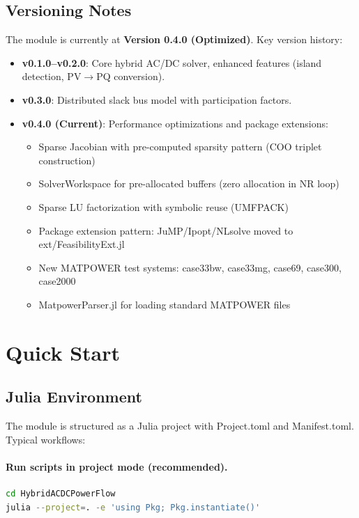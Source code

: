 \documentclass[11pt]{article}
\def\code#1{#1}%
\def\file#1{#1}%
\newcommand{\code}[1]{\nolinkurl{#1}}
\newcommand{\file}[1]{\path{#1}}
\begin{document}
\subsection{Versioning Notes}
The module is currently at \textbf{Version 0.4.0 (Optimized)}. Key version history:
\begin{itemize}[leftmargin=*]
  \item \textbf{v0.1.0--v0.2.0}: Core hybrid AC/DC solver, enhanced features (island detection, PV$\rightarrow$PQ conversion).
  \item \textbf{v0.3.0}: Distributed slack bus model with participation factors.
  \item \textbf{v0.4.0 (Current)}: Performance optimizations and package extensions:
  \begin{itemize}
    \item Sparse Jacobian with pre-computed sparsity pattern (COO triplet construction)
    \item \code{SolverWorkspace} for pre-allocated buffers (zero allocation in NR loop)
    \item Sparse LU factorization with symbolic reuse (UMFPACK)
    \item Package extension pattern: JuMP/Ipopt/NLsolve moved to \code{ext/FeasibilityExt.jl}
    \item New MATPOWER test systems: case33bw, case33mg, case69, case300, case2000
    \item \code{MatpowerParser.jl} for loading standard MATPOWER files
  \end{itemize}
\end{itemize}

\section{Quick Start}\label{sec:quick-start}

\subsection{Julia Environment}
The module is structured as a Julia project with \file{Project.toml} and \file{Manifest.toml}. Typical workflows:

\paragraph{Run scripts in project mode (recommended).}
\begin{lstlisting}[language=bash]
cd HybridACDCPowerFlow
julia --project=. -e 'using Pkg; Pkg.instantiate()'
\end{lstlisting}
\end{document}
